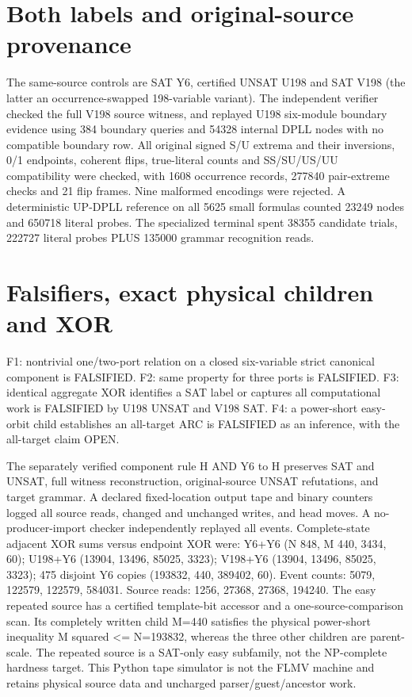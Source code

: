 \documentclass[11pt]{article}
\begin{document}
\section{Both labels and original-source provenance}
The same-source controls are SAT Y6, certified UNSAT U198 and SAT V198 (the latter an occurrence-swapped 198-variable variant). The independent verifier checked the full V198 source witness, and replayed U198 six-module boundary evidence using 384 boundary queries and 54328 internal DPLL nodes with no compatible boundary row. All original signed S/U extrema and their inversions, 0/1 endpoints, coherent flips, true-literal counts and SS/SU/US/UU compatibility were checked, with 1608 occurrence records, 277840 pair-extreme checks and 21 flip frames. Nine malformed encodings were rejected. A deterministic UP-DPLL reference on all 5625 small formulas counted 23249 nodes and 650718 literal probes. The specialized terminal spent 38355 candidate trials, 222727 literal probes PLUS 135000 grammar recognition reads.
\section{Falsifiers, exact physical children and XOR}

F1: nontrivial one/two-port relation on a closed six-variable strict canonical component is FALSIFIED. F2: same property for three ports is FALSIFIED. F3: identical aggregate XOR identifies a SAT label or captures all computational work is FALSIFIED by U198 UNSAT and V198 SAT. F4: a power-short easy-orbit child establishes an all-target ARC is FALSIFIED as an inference, with the all-target claim OPEN.

The separately verified component rule H AND Y6 to H preserves SAT and UNSAT, full witness reconstruction, original-source UNSAT refutations, and target grammar. A declared fixed-location output tape and binary counters logged all source reads, changed and unchanged writes, and head moves. A no-producer-import checker independently replayed all events. Complete-state adjacent XOR sums versus endpoint XOR were: Y6+Y6 (N 848, M 440, 3434, 60); U198+Y6 (13904, 13496, 85025, 3323); V198+Y6 (13904, 13496, 85025, 3323); 475 disjoint Y6 copies (193832, 440, 389402, 60). Event counts: 5079, 122579, 122579, 584031. Source reads: 1256, 27368, 27368, 194240. The easy repeated source has a certified template-bit accessor and a one-source-comparison scan. Its completely written child M=440 satisfies the physical power-short inequality M squared <= N=193832, whereas the three other children are parent-scale. The repeated source is a SAT-only easy subfamily, not the NP-complete hardness target. This Python tape simulator is not the FLMV machine and retains physical source data and uncharged parser/guest/ancestor work.
\end{document}

